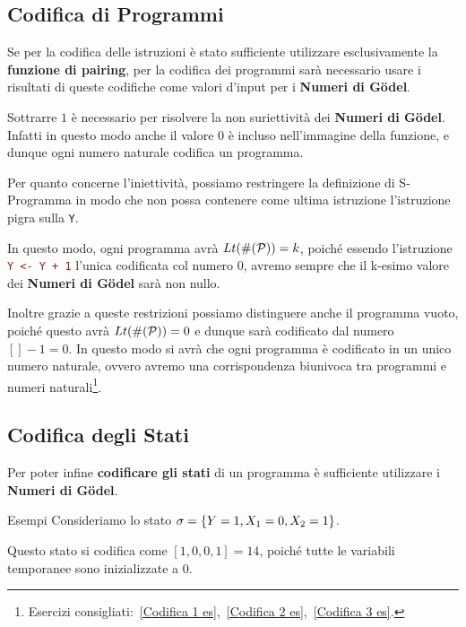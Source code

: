 \subsection{Codifica di Programmi}
Se per la codifica delle istruzioni è stato sufficiente utilizzare esclusivamente la \textbf{funzione di pairing}, per la codifica dei programmi sarà necessario usare i risultati di queste codifiche come valori d'input per i \textbf{Numeri di Gödel}.

Sottrarre \(1\) è necessario per risolvere la non suriettività dei \textbf{Numeri di Gödel}. Infatti in questo modo anche il valore \(0\) è incluso nell'immagine della funzione, e dunque ogni numero naturale codifica un programma.

Per quanto concerne l'iniettività, possiamo restringere la definizione di S-Programma in modo che non possa contenere come ultima istruzione l'istruzione pigra sulla \lstinline{Y}.

In questo modo, ogni programma avrà \(Lt(\#(\mathcal{P}))=k\), poiché essendo l'istruzione \lstinline[language=ini]{Y <- Y + 1} l'unica codificata col numero \(0\), avremo sempre che il k-esimo valore dei \textbf{Numeri di Gödel} sarà non nullo.

Inoltre grazie a queste restrizioni possiamo distinguere anche il programma vuoto, poiché questo avrà \(Lt(\#(\mathcal{P}))=0\) e dunque sarà codificato dal numero \([]-1=0\). In questo modo si avrà che ogni programma è codificato in un unico numero naturale, ovvero avremo una corrispondenza biunivoca tra programmi e numeri naturali\footnote{Esercizi consigliati:~\ref{Codifica 1 es},~\ref{Codifica 2 es},~\ref{Codifica 3 es}.}.
\newpage
\subsection{Codifica degli Stati}
Per poter infine \textbf{codificare gli stati} di un programma è sufficiente utilizzare i \textbf{Numeri di Gödel}.

\begin{generalbox}[colframe=azure-gradient-3!90!black]{Esempi}
  Consideriamo lo stato \(\sigma=\displaystyle{\left\{{Y=1, X_1=0, X_2=1}\right\}}\).

  Questo stato si codifica come \(\left[ 1, 0, 0, 1 \right]=14\), poiché tutte le variabili temporanee sono inizializzate a \(0\).

  \end{generalbox}

